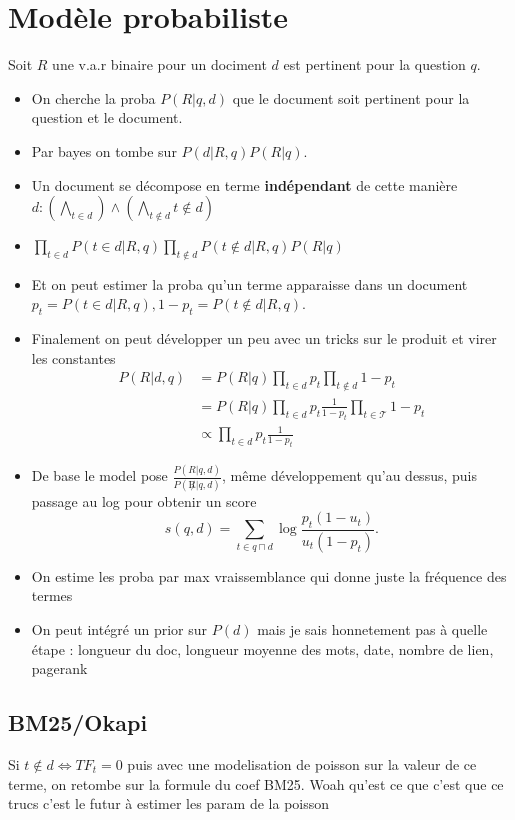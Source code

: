 \documentclass{article}
\theoremstyle{plain}%
\theoremstyle{definition}
\theoremstyle{remark}
\begin{document}
\section{Modèle probabiliste}
Soit $ R $ une v.a.r binaire pour un dociment $ d $ est pertinent pour la question $ q $. 
\begin{itemize}
    \item On cherche la proba $ P(R | q,d) $ que le document soit pertinent pour la question et le document.
    \item Par bayes on tombe sur $ P(d | R, q) P(R | q ) $.
    \item Un document se décompose en terme \textbf{indépendant} de cette manière  $d : (\bigwedge_{t \in d} ) \wedge (\bigwedge_{t \not \in d} t \not \in d)$
    \item $ \prod_{t \in d}^{} P(t \in d | R, q) \prod_{t \not\in d} P(t \not \in d | R, q) P( R | q) $
    \item Et on peut estimer la proba qu'un terme apparaisse dans un document $ p_t = P(t \in d | R, q), 1 - p_t = P(t \not\in d | R, q) $.
    \item Finalement on peut développer un peu avec un tricks sur le produit et virer les constantes\begin{align*}
        P(R | d,q) &= P(R|q) \prod_{t \in d} p_t \prod_{t \not\in d} 1 - p_t \\
                &= P(R | q) \prod_{t \in d}^{} p_t \frac{1}{1 - p_t} \prod_{t \in \mathcal{T}}^{} 1 - p_t \\ 
                &\propto \prod_{t \in d}^{} p_t \frac{1}{1 - p_t}
    \end{align*}
    \item De base le model pose $ \frac{P(R | q, d)}{P(\not R | q, d)} $, même développement qu'au dessus, puis passage au log pour obtenir un score 
    \[
        s(q,d) = \sum_{t \in q \sqcap d}^{} \log \frac{p_t (1 - u_t)}{u_t (1 - p_t)}
    .\]
    \item On estime les proba par max vraissemblance qui donne juste la fréquence des termes
    \item On peut intégré un prior sur $ P(d) $ mais je sais honnetement pas à quelle étape : longueur du doc, longueur moyenne des mots, date, nombre de lien, pagerank
\end{itemize}

\subsection{BM25/Okapi}
Si $ t \not\in d \Leftrightarrow TF_t = 0 $ puis avec une modelisation de poisson sur la valeur de ce terme, on retombe sur la formule du coef BM25. Woah qu'est ce que c'est que ce trucs c'est le futur à estimer les param de la poisson
\end{document}
